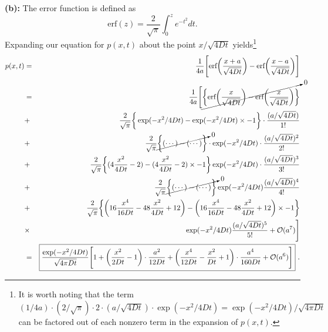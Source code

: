\textbf{(b):} The error function is defined as
\begin{equation}
\text{erf}(z) = \frac{2}{\sqrt{\pi}} \int_{0}^{z} e^{-t^2} dt.
\end{equation}
Expanding our equation for $p(x, t)$ about the point $x/\sqrt{4Dt}$ yields\footnote{It is worth noting that the term $(1/4a) \cdot (2/\sqrt{\pi}) \cdot 2 \cdot (a/\sqrt{4 D t}) \cdot \exp(-x^2/4Dt) = \exp(-x^2/4Dt)/\sqrt{4 \pi D t} $ can be factored out of each nonzero term in the expansion of $p(x,t)$.}
\begin{eqnarray}
p(x, t) &=& \frac{1}{4a} \Bigg[ \text{erf}\bigg(\frac{x+a}{\sqrt{4 D t}}\bigg) - \text{erf}\bigg(\frac{x-a}{\sqrt{4 D t}}\bigg)\Bigg]  \nonumber \\
&=& \frac{1}{4a} \Bigg[ \cancelto{0}{\bigg\{ \text{erf}\bigg(\frac{x}{\sqrt{4 D t}}\bigg) - \text{erf}\bigg(\frac{x}{\sqrt{4 D t}}\bigg) \bigg\}}  \nonumber \\ 
&+& \frac{2}{\sqrt{\pi}} \bigg\{ \exp(-x^2/4Dt) -\exp(-x^2/4Dt)  \times -1 \bigg\} \cdot \frac{(a/\sqrt{4 D t})}{1!}  \nonumber \\
&+& \frac{2}{\sqrt{\pi}} \cancelto{0}{\bigg\{ (\cdots) - (\cdots) \bigg\}} \cdot \exp(-x^2/4Dt) \cdot \frac{(a/\sqrt{4 D t})^2}{2!}  \nonumber \\
&+& \frac{2}{\sqrt{\pi}} \bigg\{ (4 \frac{x^2}{4Dt}-2) - (4 \frac{x^2}{4Dt}-2) \times -1 \bigg\} \exp(-x^2/4Dt) \cdot \frac{(a/\sqrt{4 D t})^3}{3!}  \nonumber \\
&+& \frac{2}{\sqrt{\pi}} \cancelto{0}{\bigg\{ (\cdots) - (\cdots) \bigg\}} \exp(-x^2/4Dt) \frac{(a/\sqrt{4 D t})^4}{4!}  \nonumber \\
&+& \frac{2}{\sqrt{\pi}} \bigg\{ \bigg( 16 \frac{x^4}{16 D t} - 48 \frac{x^2}{4 D t} + 12\bigg) - \bigg( 16 \frac{x^4}{16 D t} - 48 \frac{x^2}{4 D t} + 12\bigg) \times -1 \bigg\} \nonumber \\
&\times& \exp(-x^2/4Dt) \frac{(a/\sqrt{4 D t})^5}{5!} + \mathcal{O}(a^7) \Bigg] \nonumber \\
&=& \boxed{\frac{\exp(-x^2/4Dt)}{\sqrt{4 \pi D t}} \Bigg[ 1 + \bigg(\frac{x^2}{2 D t} -1 \bigg) \cdot \frac{a^2}{12 D t} 
+ \bigg(\frac{x^4}{12 D t} -\frac{x^2}{D t} + 1 \bigg) \cdot \frac{a^4}{160 D t} + \mathcal{O}(a^6) \Bigg]}~. \nonumber
\end{eqnarray}